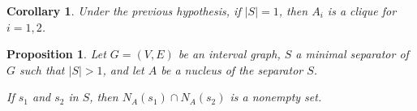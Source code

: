 \documentclass[12pt]{book}
\theoremstyle{plain}
\newtheorem{prop}[teo]{Proposition}
\newtheorem{cor}[teo]{Corollary}
\theoremstyle{remark}
\begin{document}
\begin{cor} \label{PIC_cor1}
	Under the previous hypothesis, if $|S| = 1$, then $A_i$ is a clique for $i=1, 2$.
\end{cor}


\begin{prop} \label{PIC_p4}
	Let $G=(V,E)$ be an interval graph, $S$ a minimal separator of $G$ such that $|S|>1$, and let $A$ be a nucleus of the separator $S$. 
	
	If $s_1$ and $s_2$ in $S$, then $N_{A} (s_1) \cap N_{A} (s_2)$ is a nonempty set.
\end{prop}
\end{document}
